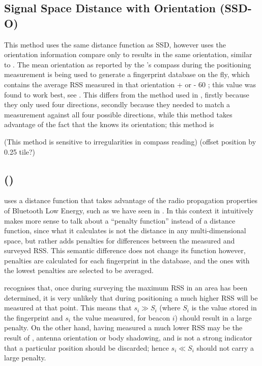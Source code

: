 \subsection{Signal Space Distance with Orientation (SSD-O)}
\label{sec:architecture-ssd-o}
This method uses the same distance function as SSD, however uses the orientation information compare only to results in the same orientation, similar to \citet{king2006compass}.
The mean orientation as reported by the \device's compass during the positioning measurement is being used to generate a fingerprint database on the fly, which contains the average RSS measured in that orientation + or - 60 \textdegree{}; this value was found to work best, see .
This differs from the method used in \citet{bahl2000radar}, firstly because they only used four directions, secondly because they needed to match a measurement against all four possible directions, while this method takes advantage of the fact that the \device knows its orientation; this method is 

(This method is sensitive to irregularities in compass reading)
(offset position by 0.25 tile?)

\subsection{\BRP (\aBRP)}
\label{sec:architecture-brp}
\BRP uses a distance function that takes advantage of the radio propagation properties of Bluetooth Low Energy, such as we have seen in .
In this context it intuitively makes more sense to talk about a ``penalty function'' instead of a distance function, since what it calculates is not the distance in any multi-dimensional space, but rather adds penalties for differences between the measured and surveyed RSS.
This semantic difference does not change its function however, penalties are calculated for each fingerprint in the database, and the ones with the lowest penalties are selected to be averaged.

\BRP recognises that, once during surveying the maximum RSS in an area has been determined, it is very unlikely that during positioning a much higher RSS will be measured at that point.
This means that $s_i \gg S_i$ (where $S_i$ is the value stored in the fingerprint and $s_i$ the value measured, for beacon $i$) should result in a large penalty.
On the other hand, having measured a much lower RSS may be the result of \mpi, antenna orientation or body shadowing, and is not a strong indicator that a particular position should be discarded; hence $s_i \ll S_i$ should not carry a large penalty.

